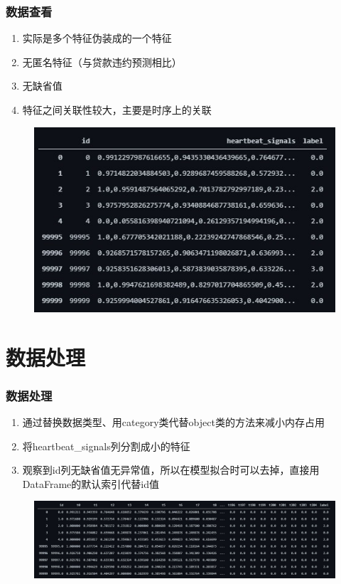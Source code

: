 \documentclass[aspectratio=43, 12pt, utf8, mathserif]{ctexbeamer} %
\begin{document}
\begin{frame}
    \frametitle{数据查看}
    \begin{enumerate}
        \item 实际是多个特征伪装成的一个特征
        \item 无匿名特征（与贷款违约预测相比）
        \item 无缺省值
        \item 特征之间关联性较大，主要是时序上的关联
    \end{enumerate}
    \begin{figure}[h]
        \centering
        \includegraphics[height=.5\textheight]{image/原数据.jpg}
    \end{figure}
\end{frame}

\section{数据处理}
\begin{frame}
    \frametitle{数据处理}
    \begin{enumerate}
        \item 通过替换数据类型、用category类代替object类的方法来减小内存占用
        \item 将heartbeat\_signals列分割成小的特征
        \item 观察到id列无缺省值无异常值，所以在模型拟合时可以去掉，直接用DataFrame的默认索引代替id值
    \end{enumerate}
    \begin{figure}[h]
        \centering
        \includegraphics[width=\textwidth]{image/处理后数据.jpg}
    \end{figure}
\end{frame}
\end{document}
